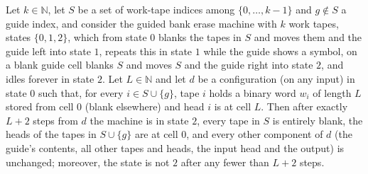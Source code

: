 \begin{theorem}
\label{Turing.un_bank_run}
\leanok
{}
Let $k\in\mathbb{N}$, let $S$ be a set of work-tape indices among $\{0,\dots,k-1\}$ and $g\notin S$
a guide index, and consider the guided bank erase machine with $k$ work tapes, states
$\{0,1,2\}$, which from state $0$ blanks the tapes in $S$ and moves them and the guide left into
state $1$, repeats this in state $1$ while the guide shows a symbol, on a blank guide cell blanks
$S$ and moves $S$ and the guide right into state $2$, and idles forever in state $2$. Let
$L\in\mathbb{N}$ and let $d$ be a configuration (on any input) in state $0$ such that, for every
$i\in S\cup\{g\}$, tape $i$ holds a binary word $w_i$ of length $L$ stored from cell $0$ (blank
elsewhere) and head $i$ is at cell $L$. Then after exactly $L+2$ steps from $d$ the machine is in
state $2$, every tape in $S$ is entirely blank, the heads of the tapes in $S\cup\{g\}$ are at
cell $0$, and every other component of $d$ (the guide's contents, all other tapes and heads,
the input head and the output) is unchanged; moreover, the state is not $2$ after any fewer than
$L+2$ steps.
\end{theorem}

